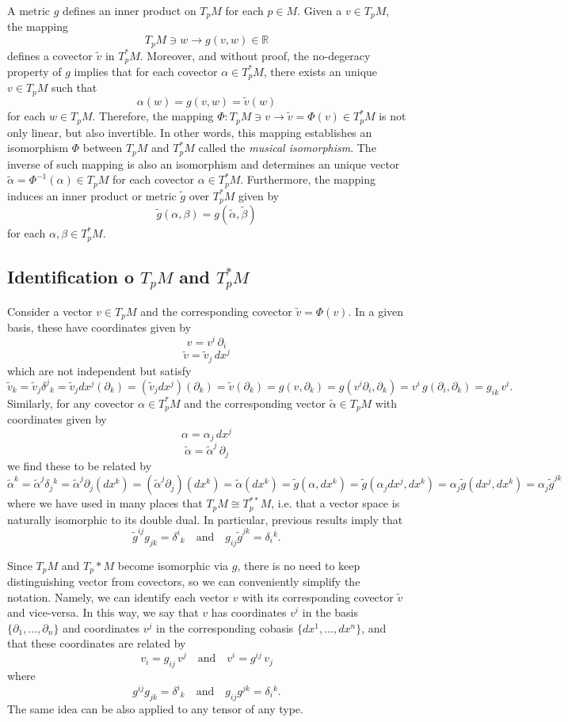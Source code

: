 \documentclass[aps,prl,twocolumn,groupedaddress]{revtex4-2}
\newcommand{\RR}{\mathbb{R}}
\begin{document}
A metric $g$ defines an inner product on $T_pM$ for each $p\in M$.
Given a $v\in T_pM$, the mapping
$$
T_pM\ni w\to g(v,w)\in \RR
$$
defines a covector $\tilde{v}$ in $T_p^*M$.
Moreover, and without proof, the no-degeracy property of $g$ implies that for each covector $\alpha\in T_p^*M$, there exists an unique $v\in T_pM$ such that
$$
\alpha(w) = g(v,w) = \tilde{v}(w)
$$
for each $w\in T_pM$.
Therefore, the mapping $\Phi:T_pM\ni v\to \tilde{v}=\Phi(v)\in T_p^*M$ is not only linear, but also invertible.
In other words, this mapping establishes an isomorphism $\Phi$ between $T_pM$ and $T_p^*M$ called the {\em musical isomorphism}.
The inverse of such mapping is also an isomorphism and determines an unique vector $\tilde{\alpha} = \Phi^{-1}(\alpha)\in T_pM$ for each covector $\alpha\in T_p^*M$.
Furthermore, the mapping induces an inner product or metric $\tilde{g}$ over $T_p^*M$ given by
$$
\tilde{g}(\alpha,\beta) = g(\tilde{\alpha},\tilde{\beta})
$$
for each $\alpha,\beta\in T_p^*M$.

\subsection{Identification o $T_pM$ and $T_p^*M$}

Consider a vector $v\in T_pM$ and the corresponding covector $\tilde{v}=\Phi(v)$.
In a given basis, these have coordinates given by
$$
v = v^i\,\partial_i
$$
$$
\tilde{v} = \tilde{v}_j\,dx^j
$$
which are not independent but satisfy
$$
\tilde{v}_k
=
\tilde{v}_j \delta^j{}_k
=
\tilde{v}_j dx^j(\partial_k)
=
(\tilde{v}_j dx^j)(\partial_k)
=
\tilde{v}(\partial_k)
=
g(v,\partial_k)
=
g(v^i\partial_i,\partial_k)
=
v^i\,
g(\partial_i,\partial_k)
=
g_{ik}\,
v^i.
$$
Similarly, for any covector $\alpha\in T_p^*M$ and the corresponding vector $\tilde{\alpha}\in T_pM$ with coordinates given by
$$
\alpha = \alpha_j\,dx^j
$$
$$
\tilde{\alpha} = \tilde{\alpha}^j\,\partial_j
$$
we find these to be related by
$$
\tilde{\alpha}^k
=
\tilde{\alpha}^j\delta_j{}^k
=
\tilde{\alpha}^j\partial_j(dx^k)
=
(\tilde{\alpha}^j\partial_j)(dx^k)
=
\tilde{\alpha}(dx^k)
=
\tilde{g}(\alpha,dx^k)
=
\tilde{g}(\alpha_jdx^j,dx^k)
=
\alpha_j\tilde{g}(dx^j,dx^k)
=
\alpha_j\tilde{g}^{jk}
$$
where we have used in many places that $T_pM\cong T_p^{**}M$, i.e. that a vector space is naturally isomorphic to its double dual.
In particular, previous results imply that
$$
\tilde{g}^{ij}g_{jk} = \delta^i{}_k
\quad
\text{and}
\quad
g_{ij}\tilde{g}^{jk} = \delta_i{}^k.
$$


Since $T_pM$ and $T_p* M$ become isomorphic via $g$, there is no need to keep distinguishing vector from covectors, so we can conveniently simplify the notation.
Namely, we can identify each vector $v$ with its corresponding covector $\tilde{v}$ and vice-versa.
In this way, we say that $v$ has coordinates $v^i$ in the basis $\{\partial_1,...,\partial_n\}$ and coordinates $v^j$ in the corresponding cobasis $\{dx^1,...,dx^n\}$, and that these coordinates are related by
$$
v_i = g_{ij}\,v^j
\quad
\text{and}
\quad
v^i = g^{ij}\,v_j
$$
where
$$
g^{ij}g_{jk} = \delta^i{}_k
\quad
\text{and}
\quad
g_{ij}g^{jk} = \delta_i{}^k.
$$
The same idea can be also applied to any tensor of any type.
\end{document}
